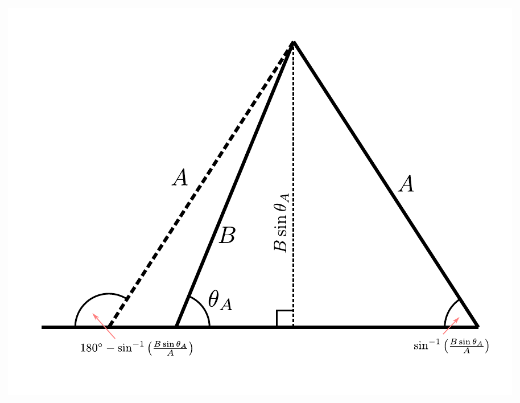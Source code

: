 \documentclass{article}
\begin{document}
\includegraphics[scale = 1.0]{side_side_angle_2}
\end{document}
